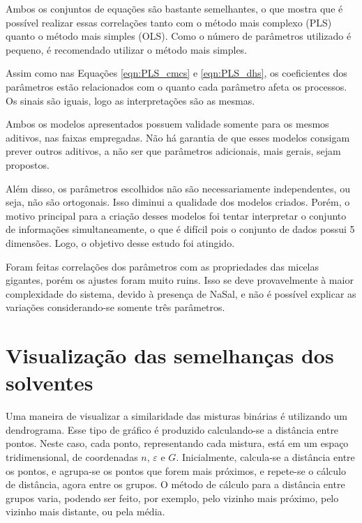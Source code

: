 		Ambos os conjuntos de equações são bastante semelhantes, o que mostra que é possível realizar essas correlações tanto com o método mais complexo (PLS) quanto o método mais simples (OLS). Como o número de parâmetros utilizado é pequeno, é recomendado utilizar o método mais simples. %
		
		Assim como nas Equações \ref{eqn:PLS_cmcs} e \ref{eqn:PLS_dhs}, os coeficientes dos parâmetros estão relacionados com o quanto cada parâmetro afeta os processos. Os sinais são iguais, logo as interpretações são as mesmas.
		
		Ambos os modelos apresentados possuem validade somente para os mesmos aditivos, nas faixas empregadas. Não há garantia de que esses modelos consigam prever outros aditivos, a não ser que parâmetros adicionais, mais gerais, sejam propostos.
		
		Além disso, os parâmetros escolhidos não são necessariamente independentes, ou seja, não são ortogonais. Isso diminui a qualidade dos modelos criados. Porém, o motivo principal para a criação desses modelos foi tentar interpretar o conjunto de informações simultaneamente, o que é difícil pois o conjunto de dados possui 5 dimensões. Logo, o objetivo desse estudo foi atingido.
		
		Foram feitas correlações dos parâmetros com as propriedades das micelas gigantes, porém os ajustes foram muito ruins. Isso se deve provavelmente à maior complexidade do sistema, devido à presença de NaSal, e não é possível explicar as variações considerando-se somente três parâmetros.
		
		
		\FloatBarrier
		
		\section{Visualização das semelhanças dos solventes} 
		
		Uma maneira de visualizar a similaridade das misturas binárias é utilizando um dendrograma. Esse tipo de gráfico é produzido calculando-se a distância entre pontos. Neste caso, cada ponto, representando cada mistura, está em um espaço tridimensional, de coordenadas \(n\), \(\varepsilon\) e \(G\). Inicialmente, calcula-se a distância entre os pontos, e agrupa-se os pontos que forem mais próximos, e repete-se o cálculo de distância, agora entre os grupos. O método de cálculo para a distância entre grupos varia, podendo ser feito, por exemplo, pelo vizinho mais próximo, pelo vizinho mais distante, ou pela média. \cite{MarciaQuimiometria}
		
